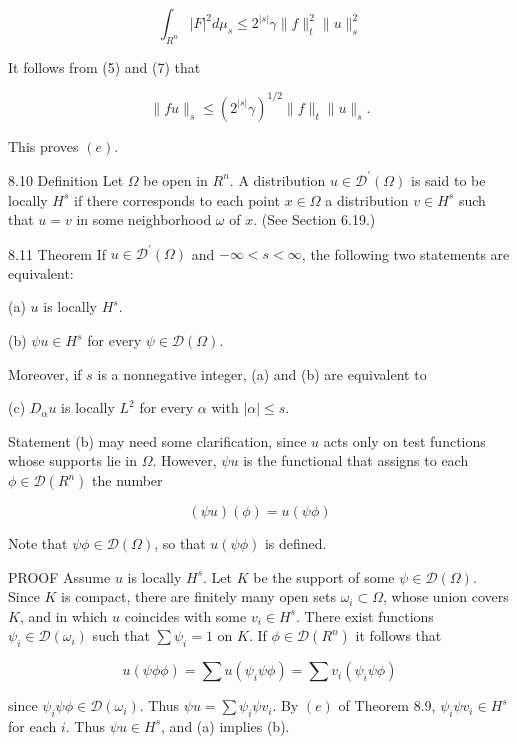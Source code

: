 \documentclass[10pt]{article}
\begin{document}
$$
\int_{R^{n}}|F|^{2} d \mu_{s} \leq 2^{|s|} \gamma\|f\|_{t}^{2}\|u\|_{s}^{2}
$$

It follows from (5) and (7) that

$$
\|f u\|_{s} \leq\left(2^{|s|} \gamma\right)^{1 / 2}\|f\|_{t}\|u\|_{s} .
$$

This proves $(e)$.

8.10 Definition Let $\Omega$ be open in $R^{n}$. A distribution $u \in \mathscr{D}^{\prime}(\Omega)$ is said to be locally $H^{s}$ if there corresponds to each point $x \in \Omega$ a distribution $v \in H^{s}$ such that $u=v$ in some neighborhood $\omega$ of $x$. (See Section 6.19.)

8.11 Theorem If $u \in \mathscr{D}^{\prime}(\Omega)$ and $-\infty<s<\infty$, the following two statements are equivalent:

(a) $u$ is locally $H^{s}$.

(b) $\psi u \in H^{s}$ for every $\psi \in \mathscr{D}(\Omega)$.

Moreover, if $s$ is a nonnegative integer, (a) and (b) are equivalent to

(c) $D_{\alpha} u$ is locally $L^{2}$ for every $\alpha$ with $|\alpha| \leq s$.

Statement (b) may need some clarification, since $u$ acts only on test functions whose supports lie in $\Omega$. However, $\psi u$ is the functional that assigns to each $\phi \in \mathscr{D}\left(R^{n}\right)$ the number

$$
(\psi u)(\phi)=u(\psi \phi)
$$

Note that $\psi \phi \in \mathscr{D}(\Omega)$, so that $u(\psi \phi)$ is defined.

PROOF Assume $u$ is locally $H^{s}$. Let $K$ be the support of some $\psi \in \mathscr{D}(\Omega)$. Since $K$ is compact, there are finitely many open sets $\omega_{i} \subset \Omega$, whose union covers $K$, and in which $u$ coincides with some $v_{i} \in H^{s}$. There exist functions $\psi_{i} \in \mathscr{D}\left(\omega_{i}\right)$ such that $\sum \psi_{i}=1$ on $K$. If $\phi \in \mathscr{D}\left(R^{n}\right)$ it follows that

$$
u(\psi \phi \phi)=\sum u\left(\psi_{i} \psi \phi\right)=\sum v_{i}\left(\psi_{i} \psi \phi\right)
$$

since $\psi_{i} \psi \phi \in \mathscr{D}\left(\omega_{i}\right)$. Thus $\psi u=\sum \psi_{i} \psi v_{i}$. By $(e)$ of Theorem 8.9, $\psi_{i} \psi v_{i} \in H^{s}$ for each $i$. Thus $\psi u \in H^{s}$, and (a) implies (b).
\end{document}

